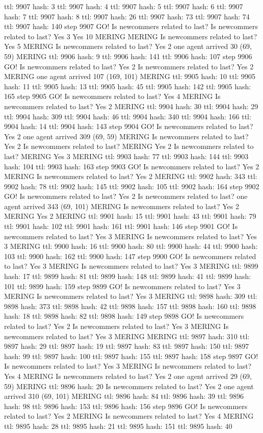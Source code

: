 ttl: 9907 hash: 3 ttl: 9907 hash: 4 ttl: 9907 hash: 5 ttl: 9907 hash: 6 ttl: 9907 hash: 7 ttl: 9907 hash: 8 ttl: 9907 hash: 26 ttl: 9907 hash: 73 ttl: 9907 hash: 74 ttl: 9907 hash: 140 step 9907 GO! Is newcommers related to last? Is newcommers related to last? Yes 3 Yes 10 MERING MERING Is newcommers related to last? Yes 5 MERING Is newcommers related to last? Yes 2 one agent arrived 30 (69, 59) MERING ttl: 9906 hash: 9 ttl: 9906 hash: 141 ttl: 9906 hash: 107 step 9906 GO! Is newcommers related to last? Yes 2 Is newcommers related to last? Yes 2 MERING one agent arrived 107 (169, 101) MERING ttl: 9905 hash: 10 ttl: 9905 hash: 11 ttl: 9905 hash: 13 ttl: 9905 hash: 45 ttl: 9905 hash: 142 ttl: 9905 hash: 165 step 9905 GO! Is newcommers related to last? Yes 4 MERING Is newcommers related to last? Yes 2 MERING ttl: 9904 hash: 30 ttl: 9904 hash: 29 ttl: 9904 hash: 309 ttl: 9904 hash: 46 ttl: 9904 hash: 340 ttl: 9904 hash: 166 ttl: 9904 hash: 14 ttl: 9904 hash: 143 step 9904 GO! Is newcommers related to last? Yes 2 one agent arrived 309 (69, 59) MERING Is newcommers related to last? Yes 2 Is newcommers related to last? MERING Yes 2 Is newcommers related to last? MERING Yes 3 MERING ttl: 9903 hash: 77 ttl: 9903 hash: 144 ttl: 9903 hash: 104 ttl: 9903 hash: 163 step 9903 GO! Is newcommers related to last? Yes 2 MERING Is newcommers related to last? Yes 2 MERING ttl: 9902 hash: 343 ttl: 9902 hash: 78 ttl: 9902 hash: 145 ttl: 9902 hash: 105 ttl: 9902 hash: 164 step 9902 GO! Is newcommers related to last? Yes 2 Is newcommers related to last? one agent arrived 343 (69, 101) MERING Is newcommers related to last? Yes 2 MERING Yes 2 MERING ttl: 9901 hash: 15 ttl: 9901 hash: 43 ttl: 9901 hash: 79 ttl: 9901 hash: 102 ttl: 9901 hash: 161 ttl: 9901 hash: 146 step 9901 GO! Is newcommers related to last? Yes 3 MERING Is newcommers related to last? Yes 3 MERING ttl: 9900 hash: 16 ttl: 9900 hash: 80 ttl: 9900 hash: 44 ttl: 9900 hash: 103 ttl: 9900 hash: 162 ttl: 9900 hash: 147 step 9900 GO! Is newcommers related to last? Yes 3 MERING Is newcommers related to last? Yes 3 MERING ttl: 9899 hash: 17 ttl: 9899 hash: 81 ttl: 9899 hash: 148 ttl: 9899 hash: 41 ttl: 9899 hash: 101 ttl: 9899 hash: 159 step 9899 GO! Is newcommers related to last? Yes 3 MERING Is newcommers related to last? Yes 3 MERING ttl: 9898 hash: 309 ttl: 9898 hash: 373 ttl: 9898 hash: 42 ttl: 9898 hash: 157 ttl: 9898 hash: 160 ttl: 9898 hash: 18 ttl: 9898 hash: 82 ttl: 9898 hash: 149 step 9898 GO! Is newcommers related to last? Yes 2 Is newcommers related to last? Yes 3 MERING Is newcommers related to last? Yes 3 MERING MERING ttl: 9897 hash: 310 ttl: 9897 hash: 29 ttl: 9897 hash: 19 ttl: 9897 hash: 83 ttl: 9897 hash: 150 ttl: 9897 hash: 99 ttl: 9897 hash: 100 ttl: 9897 hash: 155 ttl: 9897 hash: 158 step 9897 GO! Is newcommers related to last? Yes 3 MERING Is newcommers related to last? Yes 4 MERING Is newcommers related to last? Yes 2 one agent arrived 29 (69, 59) MERING ttl: 9896 hash: 20 Is newcommers related to last? Yes 2 one agent arrived 310 (69, 101) MERING ttl: 9896 hash: 84 ttl: 9896 hash: 39 ttl: 9896 hash: 98 ttl: 9896 hash: 153 ttl: 9896 hash: 156 step 9896 GO! Is newcommers related to last? Yes 2 MERING Is newcommers related to last? Yes 4 MERING ttl: 9895 hash: 28 ttl: 9895 hash: 21 ttl: 9895 hash: 151 ttl: 9895 hash: 40 
